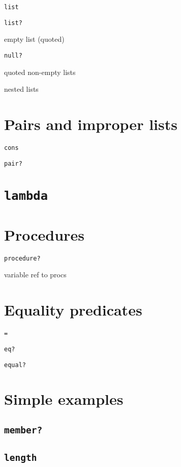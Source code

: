 \documentclass{book}
\begin{document}
\verb|list|

\verb|list?|

empty list (quoted)

\verb|null?|

quoted non-empty lists

nested lists




\section{Pairs and improper lists}

\verb|cons|

\verb|pair?|

\section{\texttt{lambda}}

\section{Procedures}

\verb|procedure?|

variable ref to procs

\section{Equality predicates}

\verb|=|

\verb|eq?|

\verb|equal?|

\section{Simple examples}

\subsection{\texttt{member?}}

\subsection{\texttt{length}}
\end{document}
